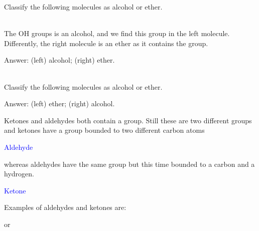 \documentclass[main.tex]{subfiles}
\newcommand{\mytriangleright}[1]{\tikz{\filldraw[draw=#1,fill=#1] (0,0) --(0em,0.6em) -- (0.4em,0.3em);}}
\begin{document}
\begin{description}
\begin{example} %
Classify the following molecules as alcohol or ether.
\begin{center} \hspace{0.5cm}  \end{center}
\\
The OH groups is an alcohol, and we find this group in the left molecule. Differently, the right molecule is an ether as it contains the  group. \\
\begin{flushright} \mytriangleright{dgreen}\small Answer: (left) alcohol; (right) ether. \end{flushright}
\faDiamond\ \\
Classify the following molecules as alcohol or ether.
\begin{center} \hspace{0.5cm}  \end{center}
\begin{flushright} \mytriangleright{dgreen}\small Answer: (left) ether; (right) alcohol. \end{flushright}
\end{example}%









\item[\docfilehook{  Aldehydes and ketones}{Aldehydes and ketones}] Ketones and aldehydes both contain a  group. Still these are two different groups and ketones have a  group bounded to two different carbon atoms





\begin{center}\hspace{0.5cm}\textcolor{blue}{Aldehyde}\end{center}
whereas aldehydes have the same  group but this time bounded to a carbon and a hydrogen. 
\begin{center}\hspace{0.5cm}\textcolor{blue}{Ketone}\end{center}
Examples of aldehydes and ketones are:
\begin{center}\hspace{1cm} or \hspace{1cm}\end{center}



\end{description}
\end{document}
